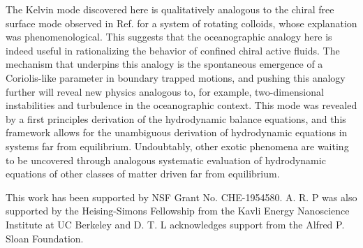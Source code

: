 \documentclass[%
 reprint,
superscriptaddress,
longbibliography,
 amsmath,amssymb,
 prl,
 citeautoscript,
]{revtex4-1}
\begin{document}


The Kelvin mode discovered here is qualitatively analogous to the chiral free surface mode observed in Ref. \cite{free_surface} for a system of rotating colloids, whose explanation was phenomenological. 
This suggests that the oceanographic analogy here is indeed useful in rationalizing the behavior of confined chiral active fluids. 
The mechanism that underpins this analogy is the spontaneous emergence of a Coriolis-like parameter in boundary trapped motions, and pushing this analogy further will reveal new physics analogous to, for example, two-dimensional instabilities and turbulence in the oceanographic context. This mode was revealed by a first principles derivation of the hydrodynamic balance equations, and this framework allows for the unambiguous derivation of hydrodynamic equations in systems far from equilibrium. Undoubtably, other exotic phenomena are waiting to be uncovered through analogous systematic evaluation of hydrodynamic equations of other classes of matter driven far from equilibrium.

\vspace{0.5cm}
This work has been supported by NSF Grant No. CHE-1954580. A. R. P was also supported by the Heising-Simons Fellowship from the Kavli Energy Nanoscience Institute at UC Berkeley and D. T. L acknowledges support from the Alfred P. Sloan Foundation.
\vspace{0.5cm}

%
\end{document}
